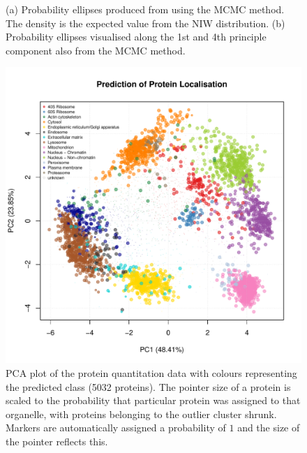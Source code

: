 \documentclass[12pt,english]{article}\usepackage[]{graphicx}\usepackage[]{color}
\makeatletter
\def\maxwidth{ %
  \ifdim\Gin@nat@width>\linewidth
    \linewidth
  \else
    \Gin@nat@width
  \fi
}
\newenvironment{knitrout}{}{} %
\makeatother
\begin{document}
\begin{figure}[ht]
\begin{subfigure}[t]{0.45\textwidth}
\begin{knitrout}
\end{knitrout}
        \centering
        \caption{}
\end{subfigure}
  \centering
  \caption{(a) Probability ellipses produced from using the MCMC method.
    The density is the expected value from the NIW distribution. (b)
    Probability ellipses visualised along the 1st and
    4th principle component also from the MCMC method.}
\label{figure::pcaellipseMCMC}
\end{figure}

\begin{figure}[ht]
\begin{knitrout}
\color{fgcolor}

{\centering \includegraphics[width=\maxwidth]{figure/unnamed-chunk-7-1} 

}



\end{knitrout}

  \centering
  \caption{PCA plot of the protein quantitation data with colours representing
    the predicted class (5032 proteins). The pointer size of a protein is scaled to
    the probability that particular protein was assigned to that organelle, with proteins belonging
    to the outlier cluster shrunk. Markers
are automatically assigned a probability of $1$ and the size of the pointer reflects this.}
  \label{fig:assignmentPCAMCMC}
\end{figure}
\end{document}
